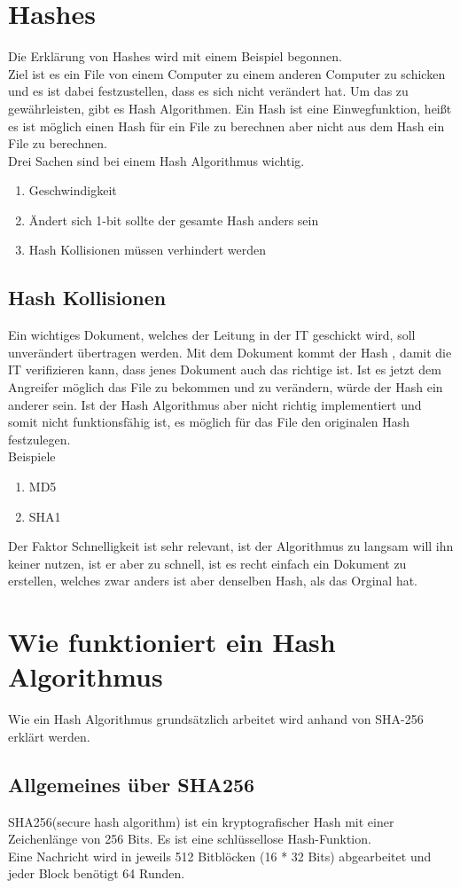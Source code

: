 {\section{Hashes}
\label{hash-expl}
Die Erklärung von Hashes wird mit einem Beispiel begonnen.\\Ziel ist es ein File von einem Computer zu einem anderen Computer zu schicken und es ist dabei festzustellen, dass es sich nicht verändert hat. Um das zu gewährleisten, gibt es Hash Algorithmen. Ein Hash ist eine Einwegfunktion, heißt es ist möglich einen Hash für ein File zu berechnen aber nicht aus dem Hash ein File zu berechnen.\\
Drei Sachen sind bei einem Hash Algorithmus wichtig.
\begin{enumerate}
\item Geschwindigkeit
\item Ändert sich 1-bit sollte der gesamte Hash anders sein
\item Hash Kollisionen müssen verhindert werden
\end{enumerate}
\subsection{Hash Kollisionen}
\label{sec:hash_coll}
Ein wichtiges Dokument, welches der Leitung in der IT geschickt wird, soll unverändert übertragen werden. Mit dem Dokument kommt der Hash , damit die IT verifizieren kann, dass jenes Dokument auch das richtige ist. Ist es jetzt dem Angreifer möglich das File zu bekommen und zu verändern, würde der Hash ein anderer sein. Ist der Hash Algorithmus aber nicht richtig implementiert und somit nicht funktionsfähig ist, es möglich für das File den originalen Hash festzulegen.
\\
Beispiele
\begin{enumerate}
\item MD5
\item SHA1
\end{enumerate}
Der Faktor Schnelligkeit ist sehr relevant, ist der Algorithmus zu langsam will ihn keiner nutzen, ist er aber zu schnell, ist es recht einfach ein Dokument zu erstellen, welches zwar anders ist aber denselben Hash, als das Orginal hat.
\section{Wie funktioniert ein Hash Algorithmus}
\label{sec:hash_algo}
Wie ein Hash Algorithmus grundsätzlich arbeitet wird anhand von SHA-256 erklärt werden. 
\subsection{Allgemeines über SHA256}
\label{sec:hash_sha}
SHA256(secure hash algorithm) ist ein kryptografischer Hash mit einer Zeichenlänge von 256 Bits. Es ist eine schlüssellose Hash-Funktion.
\\
Eine Nachricht wird in jeweils 512 Bitblöcken (16 * 32 Bits) abgearbeitet und jeder Block benötigt 64 Runden.
}
